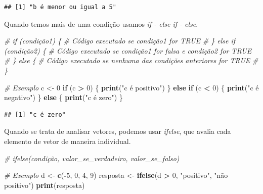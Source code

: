 \documentclass[
]{book}
\newenvironment{Shaded}{\begin{snugshade}}{\end{snugshade}}
\newcommand{\CommentTok}[1]{\textcolor[rgb]{0.56,0.35,0.01}{\textit{#1}}}
\newcommand{\ControlFlowTok}[1]{\textcolor[rgb]{0.13,0.29,0.53}{\textbf{#1}}}
\newcommand{\DecValTok}[1]{\textcolor[rgb]{0.00,0.00,0.81}{#1}}
\newcommand{\FunctionTok}[1]{\textcolor[rgb]{0.13,0.29,0.53}{\textbf{#1}}}
\newcommand{\NormalTok}[1]{#1}
\newcommand{\OtherTok}[1]{\textcolor[rgb]{0.56,0.35,0.01}{#1}}
\newcommand{\SpecialCharTok}[1]{\textcolor[rgb]{0.81,0.36,0.00}{\textbf{#1}}}
\newcommand{\StringTok}[1]{\textcolor[rgb]{0.31,0.60,0.02}{#1}}
\begin{document}
\begin{verbatim}
## [1] "b é menor ou igual a 5"
\end{verbatim}

Quando temos mais de uma condição usamos \emph{if - else if - else}.

\begin{Shaded}
\begin{Highlighting}[]
\CommentTok{\# if (condição1) \{}
  \CommentTok{\# Código executado se condição1 for TRUE}
\CommentTok{\# \} else if (condição2) \{}
  \CommentTok{\# Código executado se condição1 for falsa e condição2 for TRUE}
\CommentTok{\# \} else \{}
  \CommentTok{\# Código executado se nenhuma das condições anteriores for TRUE}
\CommentTok{\# \}}

\CommentTok{\# Exemplo}
\NormalTok{c }\OtherTok{\textless{}{-}} \DecValTok{0}
\ControlFlowTok{if}\NormalTok{ (c }\SpecialCharTok{\textgreater{}} \DecValTok{0}\NormalTok{) \{}
  \FunctionTok{print}\NormalTok{(}\StringTok{"c é positivo"}\NormalTok{)}
\NormalTok{\} }\ControlFlowTok{else} \ControlFlowTok{if}\NormalTok{ (c }\SpecialCharTok{\textless{}} \DecValTok{0}\NormalTok{) \{}
  \FunctionTok{print}\NormalTok{(}\StringTok{"c é negativo"}\NormalTok{)}
\NormalTok{\} }\ControlFlowTok{else}\NormalTok{ \{}
  \FunctionTok{print}\NormalTok{(}\StringTok{"c é zero"}\NormalTok{)}
\NormalTok{\}}
\end{Highlighting}
\end{Shaded}

\begin{verbatim}
## [1] "c é zero"
\end{verbatim}

Quando se trata de analisar vetores, podemos usar \emph{ifelse}, que avalia cada elemento de vetor de maneira individual.

\begin{Shaded}
\begin{Highlighting}[]
\CommentTok{\# ifelse(condição, valor\_se\_verdadeiro, valor\_se\_falso)}

\CommentTok{\# Exemplo}
\NormalTok{d }\OtherTok{\textless{}{-}} \FunctionTok{c}\NormalTok{(}\SpecialCharTok{{-}}\DecValTok{5}\NormalTok{, }\DecValTok{0}\NormalTok{, }\DecValTok{4}\NormalTok{, }\DecValTok{9}\NormalTok{)}
\NormalTok{resposta }\OtherTok{\textless{}{-}} \FunctionTok{ifelse}\NormalTok{(d }\SpecialCharTok{\textgreater{}} \DecValTok{0}\NormalTok{, }\StringTok{"positivo"}\NormalTok{, }\StringTok{"não positivo"}\NormalTok{)}
\FunctionTok{print}\NormalTok{(resposta)}
\end{Highlighting}
\end{Shaded}
\end{document}
